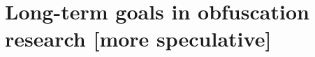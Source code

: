 %
\section{Long-term goals in obfuscation research [more speculative]}
\label{section:longterm}

      

